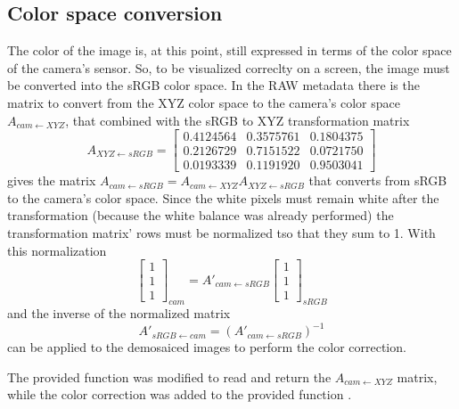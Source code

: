 \documentclass[a4paper,oneside]{article}
\begin{document}
\subsection{Color space conversion}
The color of the image is, at this point, still expressed in terms of
the color space of the camera's sensor. So, to be visualized correclty
on a screen, the image must be converted into the sRGB color space.
%
In the RAW metadata there is the matrix to convert from the XYZ color
space to the camera's color space $A_{cam \leftarrow XYZ}$, that
combined with the sRGB to XYZ transformation matrix
\begin{equation*}
  A_{XYZ \leftarrow sRGB} = \left[ \begin{array}{ccc}
      0.4124564 & 0.3575761 & 0.1804375 \\
      0.2126729 & 0.7151522 & 0.0721750 \\
      0.0193339 & 0.1191920 & 0.9503041
    \end{array} \right]
\end{equation*}
gives the matrix $A_{cam \leftarrow sRGB} = A_{cam \leftarrow XYZ}
A_{XYZ \leftarrow sRGB}$ that converts from sRGB to the camera's color
space.
%
Since the white pixels must remain white after the transformation
(because the white balance was already performed) the transformation
matrix' rows must be normalized tso that they sum to 1. With this
normalization
\begin{equation*}
  \left[ \begin{array}{c} 1 \\ 1 \\ 1 \end{array} \right]_{cam} =
  A'_{cam \leftarrow sRGB}
  \left[ \begin{array}{c} 1 \\ 1 \\ 1 \end{array} \right]_{sRGB}
\end{equation*}
and the inverse of the normalized matrix
\begin{equation*}
  A'_{sRGB \leftarrow cam}  = \left( A'_{cam \leftarrow sRGB} \right)^{-1}
\end{equation*}
can be applied to the demosaiced images to perform the color
correction.

The provided function  was modified to read and
return the $A_{cam \leftarrow XYZ}$ matrix, while the color correction
was added to the provided function .
\end{document}
